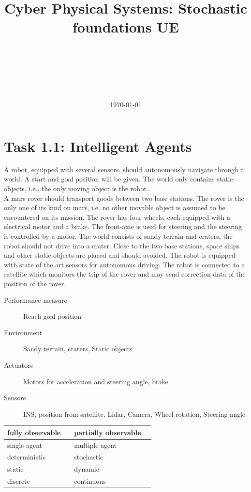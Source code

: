 \documentclass[a4paper,footsepline]{scrartcl}
\title{Cyber Physical Systems: Stochastic foundations UE}
\author{
	\authorname{Mathias Lechner and Benjamin Binder} \\
	\studentnumber{1225134, 1226121} \\
	\curriculum{066 938}\\
	\email{e1225134@student.tuwien.ac.at, e1226121@student.tuwien.ac.at}\\\\
}
\date{\today}
\begin{document}
	
	\maketitle
	\section*{Task 1.1: Intelligent Agents}
	A robot, equipped with several sensors, should autonomously navigate through a world. A
	start and goal position will be given. The world only contains static objects, i.e., the only
	moving object is the robot.\\
	A mars rover should transport goods between two base stations. The rover is the only one of its kind on mars, i.e. no other movable object is assumed to be encountered on its mission.  The rover has four wheels, each equipped with a electrical motor and a brake.
	The front-axie is used for steering and the steering is controlled by a motor. The world consists of sandy  terrain and craters, the robot should not drive into a crater. Close to the two base stations, space ships and other static objects are placed and should avoided. The robot is equipped with state of the art sensors for autonomous driving. The robot is connected to a satellite which monitors the trip of the rover and may send correction data of the position of the rover.
	\begin{description}
		\item[Performance measure]
		Reach goal position
		\item[Environment]
		Sandy terrain, craters, Static objects
		\item[Actuators]
		Motors for acceleration and steering angle, brake
		\item[Sensors]
		INS, position from satellite, Lidar, Camera, Wheel rotation, Steering angle
	\end{description}
	\vspace{0.3cm}
	\begin{tabular}{|lr|lr|}\hline
		fully observable & \Square & partially observable & \CheckedBox \\\hline
		single agent & \CheckedBox & multiple agent & \Square \\\hline
		deterministic & \Square & stochastic & \CheckedBox \\\hline
		static  & \CheckedBox & dynamic & \Square \\\hline
		discrete & \Square & continuous & \CheckedBox \\\hline
	\end{tabular}
\end{document}
